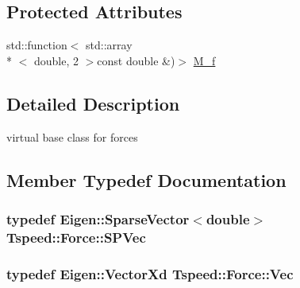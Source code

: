 \subsection*{Protected Attributes}
\begin{DoxyCompactItemize}
\item 
std\-::function$<$ std\-::array\\*
$<$ double, 2 $>$const double \&)$>$ \hyperlink{classTspeed_1_1Force_a71c3dbf2cbca2fe0c4db4db1673794e6}{M\-\_\-f}
\end{DoxyCompactItemize}


\subsection{Detailed Description}
virtual base class for forces 

\subsection{Member Typedef Documentation}
\hypertarget{classTspeed_1_1Force_a5f4cd0ccfce951a7edded01c87ba6fb6}{
\subsubsection[{S\-P\-Vec}]{\setlength{\rightskip}{0pt plus 5cm}typedef Eigen\-::\-Sparse\-Vector$<$double$>$ {\bf Tspeed\-::\-Force\-::\-S\-P\-Vec}}}\label{classTspeed_1_1Force_a5f4cd0ccfce951a7edded01c87ba6fb6}
\hypertarget{classTspeed_1_1Force_ab33d4f6bed9bf9a136afd1ac5a918c93}{
\subsubsection[{Vec}]{\setlength{\rightskip}{0pt plus 5cm}typedef Eigen\-::\-Vector\-Xd {\bf Tspeed\-::\-Force\-::\-Vec}}}\label{classTspeed_1_1Force_ab33d4f6bed9bf9a136afd1ac5a918c93}


